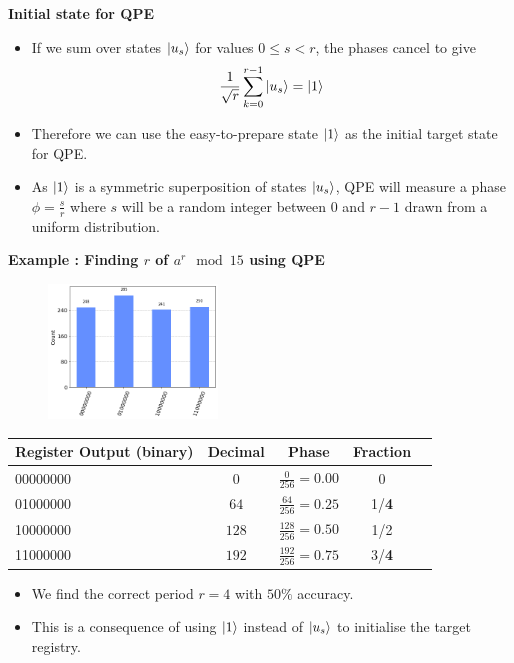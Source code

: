 \documentclass[english]{beamer}
\begin{document}
\begin{frame}{\textbf{Initial state for QPE}}

\begin{itemize}

\item If we sum over states $\ket{u_s}$ for values $0 \le s < r$, the phases cancel to give
\begin{equation}
        \frac{1}{\sqrt{r}} \sum_{k=0}^{r-1} \ket{u_s}
        	=
	\ket{1}
\end{equation}
\item Therefore we can use the easy-to-prepare state $\ket{1}$ as the initial target state for QPE. 
\item As $\ket{1}$ is a symmetric superposition of states $\ket{u_s}$, QPE will measure a phase $\phi = \frac{s}{r}$ where $s$ will be a random integer between 0 and $r-1$ drawn from a uniform distribution.
\end{itemize}


\end{frame}

\begin{frame}{\textbf{Example : Finding $r$ of $a^r \mod 15$ using QPE}}
	
\begin{figure}
	\includegraphics[width=0.4\textwidth]{figs/output}
\end{figure}
\begin{tabular}{|l|c|c|c|c|}
\hline
Register Output (binary) & Decimal & Phase & Fraction \\
\hline
00000000 & $0$ & $\frac{0}{256} = 0.00$ & 0\\
01000000 & $64$ & $\frac{64}{256} = 0.25$ &1/\textbf{4}\\
10000000 & $128$ & $\frac{128}{256} = 0.50$ & 1/2\\
11000000 & $192$ & $\frac{192}{256} = 0.75$ & 3/\textbf{4}\\
\hline
\end{tabular}

\begin{itemize}
\item We find the correct period $r=4$ with $50\%$ accuracy.
\item This is a consequence of using $\ket{1}$ instead of $\ket{u_s}$ to initialise the target registry.
\end{itemize}

\end{frame}
\end{document}
